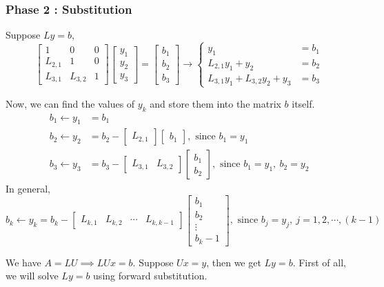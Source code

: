 \subsubsection{Phase 2 : Substitution}
\begin{commentary}
	Suppose $Ly = b$,
	\[ \begin{bmatrix} 1 & 0 &  0 \\ L_{2,1} & 1 & 0 \\ L_{3,1} & L_{3,2} & 1 \end{bmatrix} \begin{bmatrix} y_1 \\ y_2 \\ y_3 \end{bmatrix} = \begin{bmatrix} b_1 \\ b_2 \\ b_3 \end{bmatrix} \to \begin{cases} y_1 & = b_1 \\ L_{2,1}y_1 + y_2 & = b_2 \\ L_{3,1}y_1 + L_{3,2}y_2 + y_3 & = b_3 \end{cases} \]

	Now, we can find the values of $y_k$ and store them into the matrix $b$ itself.
	\begin{align*}
		b_1 \leftarrow y_1 & = b_1 \\
		b_2 \leftarrow y_2 & = b_2 - \begin{bmatrix} L_{2,1} \end{bmatrix} \begin{bmatrix} b_1 \end{bmatrix},\text{ since } b_1 = y_1 \\
			b_3 \leftarrow y_3 & = b_3 - \begin{bmatrix} L_{3,1} & L_{3,2} \end{bmatrix} \begin{bmatrix} b_1 \\ b_2 \end{bmatrix},\text{ since } b_1 = y_1,\ b_2 = y_2
	\end{align*}
	In general,
	\[ b_k \leftarrow y_k = b_k - \begin{bmatrix} L_{k,1} & L_{k,2} & \cdots & L_{k,k-1} \end{bmatrix} \begin{bmatrix} b_1 \\ b_2 \\ \vdots \\ b_k-1 \end{bmatrix},\text{ since } b_j = y_j,\ j = 1,2,\cdots,(k-1) \]
\end{commentary}
	We have $A = LU \implies LUx = b$. Suppose $Ux = y$, then we get $Ly = b$. First of all, we will solve $Ly = b$ using forward substitution.

